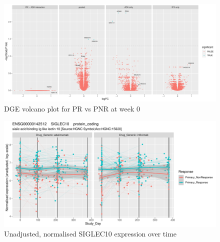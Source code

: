 \begin{outline}
\begin{figure}
    \centering
    \includegraphics[width=1.0\textwidth,page=1]{mainmatter/figures/chapter_04/plot_gene_set_enrichment.dge_result_volcano_C_1RI_1NI,C_1RA_1NA,C_(1RI_1NI)_(1RA_1NA),C_1R_1N.pdf}
    \caption{DGE volcano plot for PR vs PNR at week 0}
    \label{fig:multipants_dge_volcano_week_0_R_N}
\end{figure}

\begin{figure}
    \centering
    \includegraphics[width=1.0\textwidth,page=1]{mainmatter/figures/chapter_04/dream.E_vs_Study_Day.GENEID_ENSG00000142512.SYMBOL_SIGLEC10.pdf}
    \caption{Unadjusted, normalised SIGLEC10 expression over time}
    \label{fig:multipants_dge_SIGLEC10}
\end{figure}


\end{outline}
